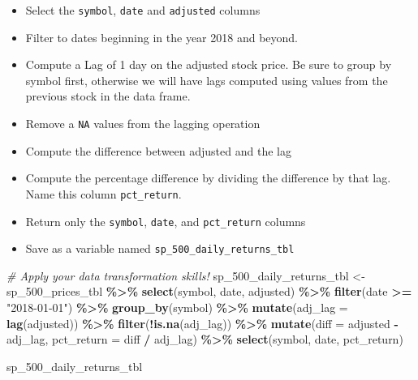 \documentclass[
]{article}
\newenvironment{Shaded}{\begin{snugshade}}{\end{snugshade}}
\newcommand{\AttributeTok}[1]{\textcolor[rgb]{0.13,0.29,0.53}{#1}}
\newcommand{\CommentTok}[1]{\textcolor[rgb]{0.56,0.35,0.01}{\textit{#1}}}
\newcommand{\FunctionTok}[1]{\textcolor[rgb]{0.13,0.29,0.53}{\textbf{#1}}}
\newcommand{\NormalTok}[1]{#1}
\newcommand{\OtherTok}[1]{\textcolor[rgb]{0.56,0.35,0.01}{#1}}
\newcommand{\SpecialCharTok}[1]{\textcolor[rgb]{0.81,0.36,0.00}{\textbf{#1}}}
\newcommand{\StringTok}[1]{\textcolor[rgb]{0.31,0.60,0.02}{#1}}
\providecommand{\tightlist}{%
  \setlength{\itemsep}{0pt}\setlength{\parskip}{0pt}}
\begin{document}
\begin{itemize}
\tightlist
\item
  Select the \texttt{symbol}, \texttt{date} and \texttt{adjusted}
  columns
\item
  Filter to dates beginning in the year 2018 and beyond.
\item
  Compute a Lag of 1 day on the adjusted stock price. Be sure to group
  by symbol first, otherwise we will have lags computed using values
  from the previous stock in the data frame.
\item
  Remove a \texttt{NA} values from the lagging operation
\item
  Compute the difference between adjusted and the lag
\item
  Compute the percentage difference by dividing the difference by that
  lag. Name this column \texttt{pct\_return}.
\item
  Return only the \texttt{symbol}, \texttt{date}, and
  \texttt{pct\_return} columns
\item
  Save as a variable named \texttt{sp\_500\_daily\_returns\_tbl}
\end{itemize}

\begin{Shaded}
\begin{Highlighting}[]
\CommentTok{\# Apply your data transformation skills!}
\NormalTok{sp\_500\_daily\_returns\_tbl }\OtherTok{\textless{}{-}}\NormalTok{ sp\_500\_prices\_tbl }\SpecialCharTok{\%\textgreater{}\%} 
    \FunctionTok{select}\NormalTok{(symbol, date, adjusted) }\SpecialCharTok{\%\textgreater{}\%}          
    \FunctionTok{filter}\NormalTok{(date }\SpecialCharTok{\textgreater{}=} \StringTok{"2018{-}01{-}01"}\NormalTok{) }\SpecialCharTok{\%\textgreater{}\%}            
    \FunctionTok{group\_by}\NormalTok{(symbol) }\SpecialCharTok{\%\textgreater{}\%} 
    \FunctionTok{mutate}\NormalTok{(}\AttributeTok{adj\_lag =} \FunctionTok{lag}\NormalTok{(adjusted)) }\SpecialCharTok{\%\textgreater{}\%} 
    \FunctionTok{filter}\NormalTok{(}\SpecialCharTok{!}\FunctionTok{is.na}\NormalTok{(adj\_lag)) }\SpecialCharTok{\%\textgreater{}\%} 
    \FunctionTok{mutate}\NormalTok{(}\AttributeTok{diff =}\NormalTok{ adjusted }\SpecialCharTok{{-}}\NormalTok{ adj\_lag,}
           \AttributeTok{pct\_return =}\NormalTok{ diff }\SpecialCharTok{/}\NormalTok{ adj\_lag) }\SpecialCharTok{\%\textgreater{}\%} 
    \FunctionTok{select}\NormalTok{(symbol, date, pct\_return)}

\NormalTok{sp\_500\_daily\_returns\_tbl}
\end{Highlighting}
\end{Shaded}
\end{document}
